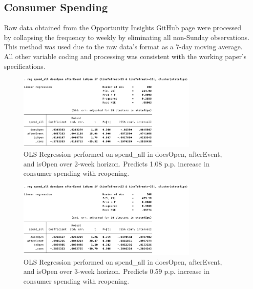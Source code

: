 \documentclass[12pt,letterpaper]{article}
\begin{document}
      \subsection{Consumer Spending}
        Raw data obtained from the Opportunity Insights GitHub page were processed by collapsing the frequency to weekly by eliminating all non-Sunday observations.  This method was used due to the raw data’s format as a 7-day moving average.  All other variable coding and processing was consistent with the working paper’s specifications.
        \begin{figure}[!ht]
          \centering
          \includegraphics[width=0.8\textwidth]{figures/spend_all_2wk.png}
          \caption{OLS Regression performed on spend\_all in doesOpen, afterEvent, and isOpen over 2-week horizon.  Predicts 1.08 p.p. increase in consumer spending with reopening.}
          \label{fig:figures-spend_all_2wk-png}
        \end{figure}
        \begin{figure}[!ht]
          \centering
          \includegraphics[width=0.8\textwidth]{figures/spend_all_3wk.png}
          \caption{OLS Regression performed on spend\_all in doesOpen, afterEvent, and isOpen over 3-week horizon.  Predicts 0.59 p.p. increase in consumer spending with reopening.}
          \label{fig:figures-spend_all_3wk-png}
        \end{figure}
\end{document}
